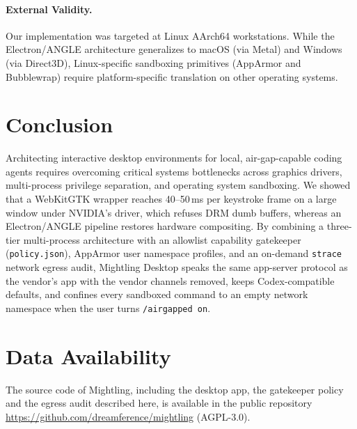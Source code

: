 \documentclass[11pt]{article}
\newcommand{\code}[1]{\texttt{#1}}
\newcommand{\agon}{\code{/airgapped on}}
\begin{document}
\paragraph{External Validity.} Our implementation was targeted at Linux AArch64 workstations. While the Electron/ANGLE
architecture generalizes to macOS (via Metal) and Windows (via Direct3D), Linux-specific sandboxing primitives
(AppArmor and Bubblewrap) require platform-specific translation on other operating systems.

\section{Conclusion}
\label{sec:conclusion}

Architecting interactive desktop environments for local, air-gap-capable coding agents requires overcoming critical
systems bottlenecks across graphics drivers, multi-process privilege separation, and operating system sandboxing. We
showed that a WebKitGTK wrapper reaches 40--50\,ms per keystroke frame on a large window under NVIDIA's driver, which
refuses DRM dumb buffers, whereas an Electron/ANGLE pipeline restores hardware compositing. By combining a three-tier
multi-process architecture with an allowlist capability gatekeeper (\code{policy.json}), AppArmor user namespace
profiles, and an on-demand \code{strace} network egress audit, Mightling Desktop speaks the same app-server protocol
as the vendor's app with the vendor channels removed, keeps Codex-compatible defaults, and confines every
sandboxed command to an empty network namespace when the user turns \agon.

\section*{Data Availability}

The source code of Mightling, including the desktop app, the gatekeeper policy and the egress audit described here, is
available in the public repository \url{https://github.com/dreamference/mightling} (AGPL-3.0).



\end{document}
